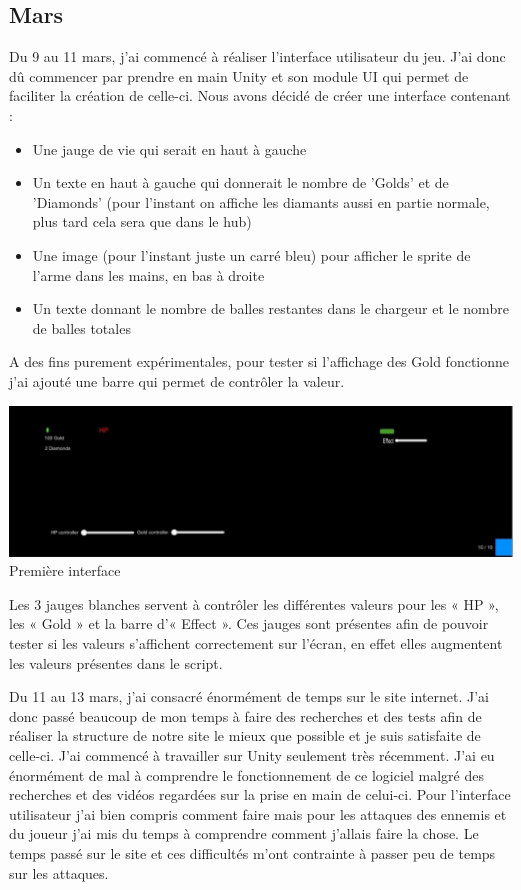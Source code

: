 \documentclass[]{extarticle}
\begin{document}
\begin{spacing}{1.25}
\subsection{Mars}
\bigbreak
\bigbreak

Du 9 au 11 mars, j’ai commencé à réaliser l'interface utilisateur du jeu. J’ai donc dû commencer par prendre en main Unity et son module UI qui permet de faciliter la création de celle-ci. Nous avons décidé de créer une interface contenant :
\bigbreak
\begin{itemize}
\item Une jauge de vie qui serait en haut à gauche
\item Un texte en haut à gauche qui donnerait le nombre de 'Golds' et de 'Diamonds' (pour l'instant on affiche les diamants aussi en partie normale, plus tard cela sera que dans le hub)
\item Une image (pour l’instant juste un carré bleu) pour afficher le sprite de l’arme dans les mains, en bas à droite
\item Un texte donnant le nombre de balles restantes dans le chargeur et le nombre de balles totales
\end{itemize}
\bigbreak
A des fins purement expérimentales, pour tester si l’affichage des Gold fonctionne j’ai ajouté une barre qui permet de contrôler la valeur.
\bigbreak
\begin{center}
\includegraphics[scale = 0.32]{interface.jpg}
\smallbreak
Première interface
\end{center}
\bigbreak
Les 3 jauges blanches servent à contrôler les différentes valeurs pour les « HP », les « Gold » et la barre d’« Effect ». Ces jauges sont présentes afin de pouvoir tester si les valeurs s'affichent correctement sur l'écran, en effet elles augmentent les valeurs présentes dans le script.
\bigbreak 

\bigbreak
\bigbreak

Du 11 au 13 mars, j’ai consacré énormément de temps sur le site internet. J’ai donc passé beaucoup de mon temps à faire des recherches et des tests afin de réaliser la structure de notre site le mieux que possible et je suis satisfaite de celle-ci. J’ai commencé à travailler sur Unity seulement très récemment. J’ai eu énormément de mal à comprendre le fonctionnement de ce logiciel malgré des recherches et des vidéos regardées sur la prise en main de celui-ci. Pour l’interface utilisateur j’ai bien compris comment faire mais pour les attaques des ennemis et du joueur j’ai mis du temps à comprendre comment j’allais faire la chose. Le temps passé sur le site et ces difficultés m’ont contrainte à passer peu de temps sur les attaques.
\newpage


\end{spacing}
\end{document}
